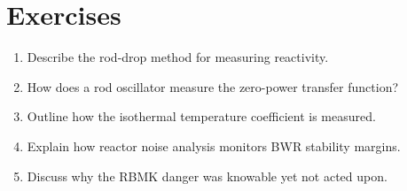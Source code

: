 \section*{Exercises}
\begin{enumerate}[leftmargin=*,itemsep=2pt]
\item Describe the rod-drop method for measuring reactivity.
\item How does a rod oscillator measure the zero-power transfer function?
\item Outline how the isothermal temperature coefficient is measured.
\item Explain how reactor noise analysis monitors BWR stability margins.
\item Discuss why the RBMK danger was knowable yet not acted upon.
\end{enumerate}
